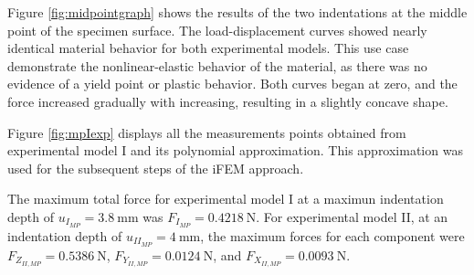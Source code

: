 Figure \ref{fig:midpointgraph} shows the results of the two indentations at the middle point 
 of the specimen surface.
The load-displacement curves showed nearly identical material behavior for both 
experimental models. This use case demonstrate the nonlinear-elastic behavior of the material, 
as there was no evidence of a yield point or plastic behavior. 
Both curves began at zero, and the force increased gradually with increasing,
resulting in a slightly concave shape. 

Figure \ref{fig:mpIexp} displays all the measurements points obtained from experimental model I and its 
polynomial approximation. This approximation was used for the subsequent steps of the iFEM approach.

The maximum total force for experimental model I at a maximun indentation depth of 
$u_{I_{MP}} = \SI{3.8}{\milli \m}$ was $F_{I_{MP}} = \SI{0.4218}{\newton}$. For experimental 
model II, at an indentation depth of 
$u_{II_{MP}} = \SI{4}{\milli \m}$, the maximum forces for each component were
 $F_{Z_{II,MP}} = \SI{0.5386}{\newton}$, $F_{Y_{II,MP}} = \SI{0.0124}{\newton}$, and $F_{X_{II,MP}} = \SI{0.0093}{\newton}$.

